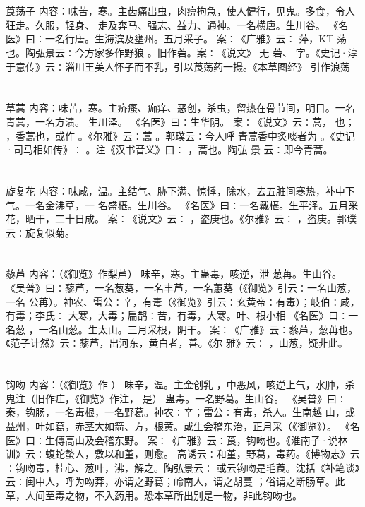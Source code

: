 \documentclass[12pt,UTF8]{ctexbook}
\begin{document}
\chapter{}莨荡子
内容：味苦，寒。主齿痛出虫，肉痹拘急，使人健行，见鬼。多食，令人狂走。久服，轻身、 
走及奔马、强志、益力、通神。一名横唐。生川谷。 
《名医》曰∶一名行唐。生海滨及壅州。五月采子。 
案∶《广雅》云∶ 萍，KT 荡也。陶弘景云∶今方家多作野狼 。旧作菪。案∶《说文》 
无 
菪、 字。《史记·淳于意传》云∶淄川王美人怀子而不乳，引以莨荡药一撮。《本草图经》 
引作浪荡 


\chapter{}草蒿
内容：味苦，寒。主疥瘙、痂痒、恶创，杀虫，留热在骨节间，明目。一名青蒿，一名方溃。 
生川泽。 
《名医》曰∶生华阴。 
案∶《说文》云∶蒿， 也； ，香蒿也，或作 。《尔雅》云∶蒿 。郭璞云∶今人呼 
青蒿香中炙啖者为 。《史记·司马相如传》∶ 。注《汉书音义》曰∶ ，蒿也。陶弘 
景 
云∶即今青蒿。 


\chapter{}旋复花
内容：味咸，温。主结气、胁下满、惊悸，除水，去五脏间寒热，补中下气。一名金沸草，一 
名盛椹。生川谷。 
《名医》曰∶一名戴椹。生平泽。五月采花，晒干，二十日成。 
案∶《说文》云∶ ，盗庚也。《尔雅》云∶ ，盗庚。郭璞云∶旋复似菊。 


\chapter{}藜芦
内容：（《御览》作梨芦） 
味辛，寒。主蛊毒，咳逆，泄 
葱苒。生山谷。 
《吴普》曰∶藜芦，一名葱葵，一名丰芦，一名蕙葵（《御览》引云∶一名山葱，一名 
公苒）。神农、雷公∶辛，有毒（《御览》引云∶玄黄帝∶有毒）；岐伯∶咸，有毒；李氏∶ 
大寒，大毒；扁鹊∶苦，有毒，大寒。叶、根小相 
《名医》曰∶一名葱 ，一名山葱。生太山。三月采根，阴干。 
案∶《广雅》云∶藜芦，葱苒也。《范子计然》云∶藜芦，出河东，黄白者，善。《尔 
雅》云∶ ，山葱，疑非此。 


\chapter{}钩吻
内容：（《御览》作 ） 
味辛，温。主金创乳 ，中恶风，咳逆上气，水肿，杀鬼注（旧作疰，《御览》作注， 
是） 
蛊毒。一名野葛。生山谷。 
《吴普》曰∶秦，钩肠，一名毒根，一名野葛。神农∶辛；雷公∶有毒，杀人。生南越 
山，或益州，叶如葛，赤茎大如箭、方，根黄。或生会稽东治，正月采（《御览》）。 
《名医》曰∶生傅高山及会稽东野。 
案∶《广雅》云∶莨，钩吻也。《淮南子·说林训》云∶蝮蛇螫人，敷以和堇，则愈。 
高诱云∶和堇，野葛，毒药。《博物志》云∶钩吻毒，桂心、葱叶，沸，解之。陶弘景云∶ 
或云钩吻是毛莨。沈括《补笔谈》云∶闽中人，呼为吻莽，亦谓之野葛；岭南人，谓之胡蔓 
；俗谓之断肠草。此草，人间至毒之物，不入药用。恐本草所出别是一物，非此钩吻也。 
\end{document}
